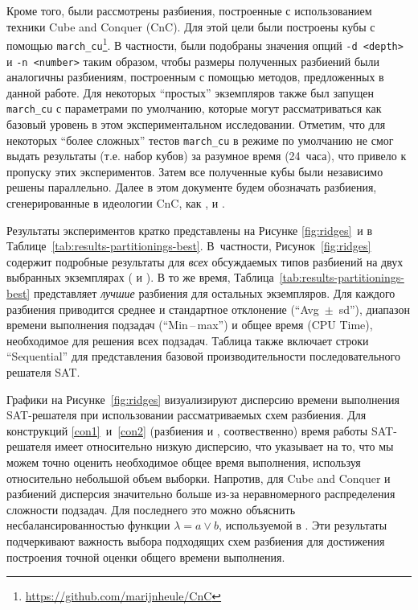 Кроме того, были рассмотрены разбиения, построенные с использованием техники Cube and Conquer (CnC).
Для этой цели были построены кубы с помощью \texttt{march\_cu}\footnote{\url{https://github.com/marijnheule/CnC}}.
В частности, были подобраны значения опций \texttt{-d <depth>} и \texttt{-n <number>} таким образом, чтобы размеры полученных разбиений были аналогичны разбиениям, построенным с помощью методов, предложенных в данной работе.
Для некоторых \enquote{простых} экземпляров также был запущен \texttt{march\_cu} с параметрами по умолчанию, которые могут рассматриваться как базовый уровень в этом экспериментальном исследовании.
Отметим, что для некоторых \enquote{более сложных} тестов \texttt{march\_cu} в режиме по умолчанию не смог выдать результаты (т.е. набор кубов) за разумное время (24~часа), что привело к пропуску этих экспериментов.
Затем все полученные кубы были независимо решены параллельно.
Далее в этом документе будем обозначать разбиения, сгенерированные в идеологии CnC, как ,  и .

Результаты экспериментов кратко представлены на Рисунке \ref{fig:ridges}~и в Таблице~\ref{tab:results-partitionings-best}.
В~частности, Рисунок~\ref{fig:ridges} содержит
подробные результаты для \textit{всех} обсуждаемых типов разбиений на двух выбранных экземплярах ( и ).
В то же время, Таблица~\ref{tab:results-partitionings-best} представляет \emph{лучшие} разбиения для остальных экземпляров.
Для каждого разбиения приводится среднее и стандартное отклонение (\enquote{Avg~$\pm$~sd}), диапазон времени выполнения подзадач (\enquote{Min\,--\,max}) и общее  время (CPU Time), необходимое для решения всех подзадач.
Таблица также включает строки \enquote{Sequential} для представления базовой производительности последовательного решателя SAT.

Графики на Рисунке~\ref{fig:ridges} визуализируют дисперсию времени выполнения SAT-решателя при использовании рассматриваемых схем разбиения.
Для конструкций \ref{con1}~и~\ref{con2} (разбиения  и , соотвественно) время работы SAT-решателя имеет относительно низкую дисперсию, что указывает на то, что мы можем точно оценить необходимое общее время выполнения, используя относительно небольшой объем выборки.
Напротив, для Cube and Conquer и разбиений  дисперсия значительно больше из-за неравномерного распределения сложности подзадач.
Для последнего это можно объяснить несбалансированностью функции $\lambda = a \lor b$, используемой в .
Эти результаты подчеркивают важность выбора подходящих схем разбиения для достижения построения точной оценки общего времени выполнения.

